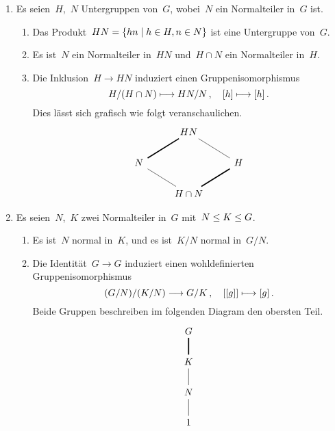 \begin{corollary}
  \leavevmode
  \begin{enumerate}
    \item
      Es seien~$H$,~$N$ Untergruppen von~$G$, wobei~$N$ ein Normalteiler in~$G$ ist.
      \begin{enumerate}
        \item
          Das Produkt~$HN = \{ hn \suchthat h \in H, n \in N \}$ ist eine Untergruppe von~$G$.
        \item
          Es ist~$N$ ein Normalteiler in~$HN$ und~$H \cap N$ ein Normalteiler in~$H$.
        \item
          Die Inklusion~$H \to HN$ induziert einen Gruppenisomorphismus
          \[
            H / (H \cap N)
            \mapsto
            HN / N \,,
            \quad
            \class{h}
            \mapsto
            \class{h} \,.
          \]
          Dies lässt sich grafisch wie folgt veranschaulichen.
          \[
            \begin{tikzcd}
              {}
              &
              HN
              &
              {}
              \\
              N
              \arrow[very thick, dash]{ur}
              &
              {}
              &
              H
              \arrow[dash]{ul}
              \\
              {}
              &
              H \cap N
              \arrow[dash]{ul}
              \arrow[very thick, dash]{ur}
              &
              {}
            \end{tikzcd}
          \]
      \end{enumerate}
    \item
      Es seien~$N$,~$K$ zwei Normalteiler in~$G$ mit~$N \leq K \leq G$.
      \begin{enumerate}
        \item
          Es ist~$N$ normal in~$K$, und es ist~$K/N$ normal in~$G/N$.
        \item
          Die Identität~$G \to G$ induziert einen wohldefinierten Gruppenisomorphismus
          \[
            (G/N) / (K/N)
            \to
            G / K \,,
            \quad
            \class{ \class{g} }
            \mapsto
            \class{g} \,.
          \]
          Beide Gruppen beschreiben im folgenden Diagram den obersten Teil.
          \[
            \begin{tikzcd}
              G
              \\
              K
              \arrow[very thick, dash]{u}
              \\
              N
              \arrow[dash]{u}
              \\
              1
              \arrow[dash]{u}
            \end{tikzcd}
          \]
      \end{enumerate}
  \end{enumerate}
\end{corollary}






